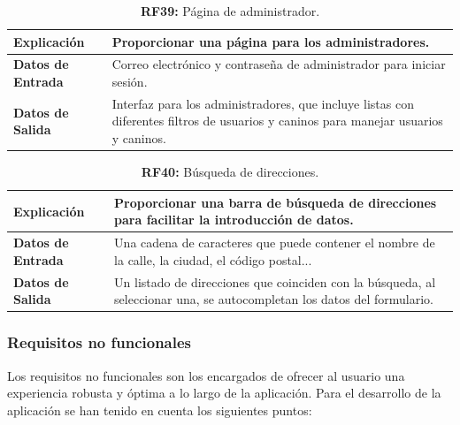 \documentclass[a4paper, 12pt]{article}
\begin{document}
\begin{table}[H]
\captionsetup{justification=raggedright,singlelinecheck=false}
\caption{\textbf{RF39:} Página de administrador.}
\label{tab:RF39}
	\begin{tabular}{|m{5cm}|m{10cm}|}
	\hline
	\textbf{Explicación} & Proporcionar una página para los administradores. \\ 
	\hline
	\textbf{Datos de Entrada} & Correo electrónico y contraseña de administrador para iniciar sesión. \\ 
	\hline
	\textbf{Datos de Salida} & Interfaz para los administradores, que incluye listas con diferentes filtros de usuarios y caninos para manejar usuarios y caninos. \\ 
	\hline
\end{tabular}
\end{table}

\begin{table}[H]
\captionsetup{justification=raggedright,singlelinecheck=false}
\caption{\textbf{RF40:} Búsqueda de direcciones.}
\label{tab:RF40}
	\begin{tabular}{|m{5cm}|m{10cm}|}
	\hline
	\textbf{Explicación} & Proporcionar una barra de búsqueda de direcciones para facilitar la introducción de datos. \\ 
	\hline
	\textbf{Datos de Entrada} & Una cadena de caracteres que puede contener el nombre de la calle, la ciudad, el código postal... \\ 
	\hline
	\textbf{Datos de Salida} & Un listado de direcciones que coinciden con la búsqueda, al seleccionar una, se autocompletan los datos del formulario. \\ 
	\hline
\end{tabular}
\end{table}


\subsubsection{Requisitos no funcionales}

Los requisitos no funcionales son los encargados de ofrecer al usuario una experiencia robusta y óptima a lo largo de la aplicación. Para el desarrollo de la aplicación se han tenido en cuenta los siguientes puntos:
\end{document}
